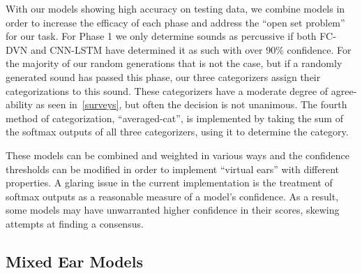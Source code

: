 \documentclass[\main/thesis.tex]{subfiles}
\begin{document}
With our models showing high accuracy on testing data, we combine models in order to increase the efficacy of each phase and address the \enquote{open set problem} for our task. For Phase 1 we only determine sounds as percussive if both FC-DVN and CNN-LSTM have determined it as such with over 90\% confidence. For the majority of our random generations that is not the case, but if a randomly generated sound has passed this phase, our three categorizers assign their categorizations to this sound. These categorizers have a moderate degree of agree-ability as seen in~\ref{surveys}, but often the decision is not unanimous. The fourth method of categorization, \enquote{averaged-cat}, is implemented by taking the sum of the softmax outputs of all three categorizers, using it to determine the category. 

These models can be combined and weighted in various ways and the confidence thresholds can be modified in order to implement \enquote{virtual ears} with different properties. A glaring issue in the current implementation is the treatment of softmax outputs as a reasonable measure of a model's confidence. As a result, some models may have unwarranted higher confidence in their scores, skewing attempts at finding a consensus. 
\subsection{Mixed Ear Models}
\end{document}
